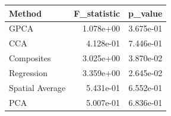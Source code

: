 \begin{tabular}{lrr}
\toprule
Method & F_statistic & p_value \\
\midrule
GPCA & 1.078e+00 & 3.675e-01 \\
CCA & 4.128e-01 & 7.446e-01 \\
Composites & 3.025e+00 & 3.870e-02 \\
Regression & 3.359e+00 & 2.645e-02 \\
Spatial Average & 5.431e-01 & 6.552e-01 \\
PCA & 5.007e-01 & 6.836e-01 \\
\bottomrule
\end{tabular}
